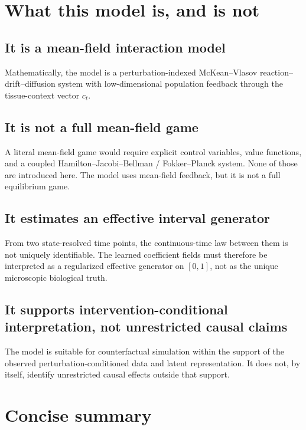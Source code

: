 \documentclass[11pt]{article}
\begin{document}
\section{What this model is, and is not}

\subsection{It is a mean-field interaction model}

Mathematically, the model is a perturbation-indexed McKean--Vlasov reaction--drift--diffusion system with low-dimensional population feedback through the tissue-context vector $c_t$.

\subsection{It is not a full mean-field game}

A literal mean-field game would require explicit control variables, value functions, and a coupled Hamilton--Jacobi--Bellman / Fokker--Planck system. None of those are introduced here. The model uses mean-field feedback, but it is not a full equilibrium game.

\subsection{It estimates an effective interval generator}

From two state-resolved time points, the continuous-time law between them is not uniquely identifiable. The learned coefficient fields must therefore be interpreted as a regularized effective generator on $[0,1]$, not as the unique microscopic biological truth.

\subsection{It supports intervention-conditional interpretation, not unrestricted causal claims}

The model is suitable for counterfactual simulation within the support of the observed perturbation-conditioned data and latent representation. It does not, by itself, identify unrestricted causal effects outside that support.

\section{Concise summary}
\end{document}

